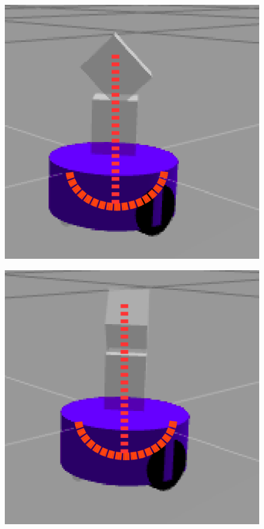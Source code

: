 \documentclass[conference]{IEEEtran}
\begin{document}
\begin{figure}[H]
\begin{minipage}{.45\linewidth}
  \centering
  \includegraphics[width=\linewidth]{pan.png}
  \label{fig:pan}
\end{minipage}\quad
\begin{minipage}{.45\linewidth}
  \centering
  \includegraphics[width=\linewidth]{pan2.png}
  \label{fig:pan2}
\end{minipage}
\end{figure}
\end{document}
